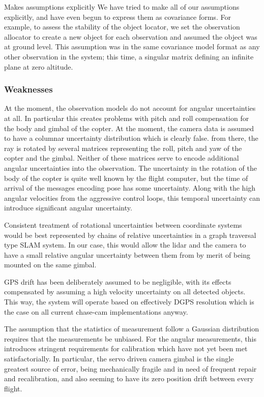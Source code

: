 \documentclass[a4paper, 11pt, titlepage]{article}
\begin{document}
      Makes assumptions explicitly
      We have tried to make all of our assumptions explicitly, and have even begun to express them as covariance forms.
      For example, to assess the stability of the object locator, we set the observation allocator to create a new object for each observation and assumed the object was at ground level.  This assumption was in the same covariance model format as any other observation in the system; this time, a singular matrix defining an infinite plane at zero altitude.


    \subsubsection{Weaknesses}
      At the moment, the observation models do not account for angular uncertainties at all.  In particular this creates problems with pitch and roll compensation for the body and gimbal of the copter.
      At the moment, the camera data is assumed to have a columnar uncertainty distribution which is clearly false.  from there, the ray is rotated by several matrices representing the roll, pitch and yaw of the copter and the gimbal.  Neither of these matrices serve to encode additional angular uncertainties into the observation.
      The uncertainty in the rotation of the body of the copter is quite well known by the flight computer, but the time of arrival of the messages encoding pose has some uncertainty.  Along with the high angular velocities from the aggressive control loops, this temporal uncertainty can introduce significant angular uncertainty.

      Consistent treatment of rotational uncertainties between coordinate systems would be best represented by chains of relative uncertainties in a graph traversal type SLAM system.  In our case, this would allow the lidar and the camera to have a small relative angular uncertainty between them from by merit of being mounted on the same gimbal.

      GPS drift has been deliberately assumed to be negligible, with its effects compensated by assuming a high velocity uncertainty on all detected objects.  This way, the system will operate based on effectively DGPS resolution which is the case on all current chase-cam implementations anyway.

      The assumption that the statistics of measurement follow a Gaussian distribution requires that the measurements be unbiased.  For the angular measurements, this introduces stringent requirements for calibration which have not yet been met satisfactorially.  In particular, the servo driven camera gimbal is the single greatest source of error, being mechanically fragile and in need of frequent repair and recalibration, and also seeming to have its zero position drift between every flight.
\end{document}
